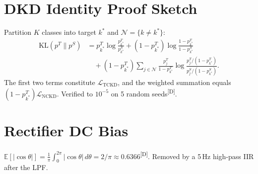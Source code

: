 \documentclass[conference]{IEEEtran}
\newcommand{\evD}{\textsuperscript{\textcolor{derived}{[D]}}\xspace}
\begin{document}
\appendix
\section{DKD Identity Proof Sketch}

Partition $K$ classes into target $k^*$ and $\mathcal{N}=\{k\ne k^*\}$:
\begin{align}
  \mathrm{KL}(p^T\|p^S)
  &= p_{k^*}^T\log\frac{p_{k^*}^T}{p_{k^*}^S}
     +(1{-}p_{k^*}^T)\log\frac{1{-}p_{k^*}^T}{1{-}p_{k^*}^S} \nonumber\\
  &\quad + (1{-}p_{k^*}^T)
    \sum_{j\in\mathcal{N}}
      \frac{p_j^T}{1{-}p_{k^*}^T}
      \log\frac{p_j^T/(1{-}p_{k^*}^T)}{p_j^S/(1{-}p_{k^*}^S)}.
  \label{eq:dkd_proof}
\end{align}
The first two terms constitute $\mathcal{L}_\mathrm{TCKD}$, and the
weighted summation equals $(1{-}p_{k^*}^T)\mathcal{L}_\mathrm{NCKD}$.
Verified to $10^{-5}$ on 5 random seeds\evD.

\section{Rectifier DC Bias}

$\mathbb{E}[|\cos\theta|]
  =\tfrac{1}{\pi}\!\int_0^{2\pi}|\cos\theta|\,d\theta
  =2/\pi\approx0.6366$\evD.
Removed by a 5\,Hz high-pass IIR after the LPF.



\end{document}
